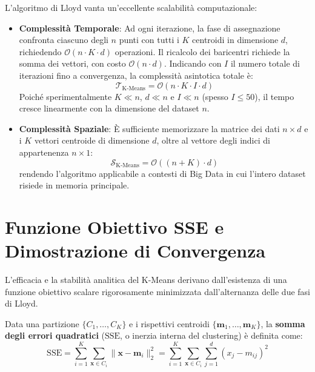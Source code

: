 L'algoritmo di Lloyd vanta un'eccellente scalabilità computazionale:
\begin{itemize}
    \item \textbf{Complessità Temporale}: Ad ogni iterazione, la fase di assegnazione confronta ciascuno degli $n$ punti con tutti i $K$ centroidi in dimensione $d$, richiedendo $\mathcal{O}(n \cdot K \cdot d)$ operazioni. Il ricalcolo dei baricentri richiede la somma dei vettori, con costo $\mathcal{O}(n \cdot d)$. Indicando con $I$ il numero totale di iterazioni fino a convergenza, la complessità asintotica totale è:
    \begin{equation}
        \mathcal{T}_{\text{K-Means}} = \mathcal{O}(n \cdot K \cdot I \cdot d)
    \end{equation}
    Poiché sperimentalmente $K \ll n$, $d \ll n$ e $I \ll n$ (spesso $I \le 50$), il tempo cresce linearmente con la dimensione del dataset $n$.
    \item \textbf{Complessità Spaziale}: È sufficiente memorizzare la matrice dei dati $n \times d$ e i $K$ vettori centroide di dimensione $d$, oltre al vettore degli indici di appartenenza $n \times 1$:
    \begin{equation}
        \mathcal{S}_{\text{K-Means}} = \mathcal{O}((n + K) \cdot d)
    \end{equation}
    rendendo l'algoritmo applicabile a contesti di Big Data in cui l'intero dataset risiede in memoria principale.
\end{itemize}

\section{Funzione Obiettivo SSE e Dimostrazione di Convergenza}
\label{sec:dm-kmeans-sse-convergence}

L'efficacia e la stabilità analitica del K-Means derivano dall'esistenza di una funzione obiettivo scalare rigorosamente minimizzata dall'alternanza delle due fasi di Lloyd.

\begin{definition}
Data una partizione $\{C_1, \dots, C_K\}$ e i rispettivi centroidi $\{\mathbf{m}_1, \dots, \mathbf{m}_K\}$, la \textbf{somma degli errori quadratici} ($\mathrm{SSE}$, o inerzia interna del clustering) è definita come:
\begin{equation}
    \mathrm{SSE} = \sum_{i=1}^K \sum_{\mathbf{x} \in C_i} \|\mathbf{x} - \mathbf{m}_i\|_2^2 = \sum_{i=1}^K \sum_{\mathbf{x} \in C_i} \sum_{j=1}^d (x_j - m_{ij})^2
    \label{eq:dm-sse-definition}
\end{equation}
\end{definition}

